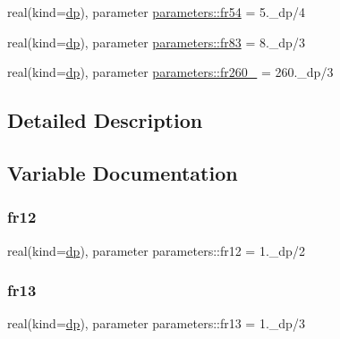 \begin{DoxyCompactItemize}
\item 
real(kind=\mbox{\hyperlink{namespaceparameters_a52f8c6351fd79345d8811e065bcbbb37}{dp}}), parameter \mbox{\hyperlink{group__FRACTIONS_ga4b5dee914c69f248bc576e0ef5a48cad}{parameters\+::fr54}} = 5.\+\_\+dp/4
\item 
real(kind=\mbox{\hyperlink{namespaceparameters_a52f8c6351fd79345d8811e065bcbbb37}{dp}}), parameter \mbox{\hyperlink{group__FRACTIONS_ga74e22f362165a8830c6acb135f54921a}{parameters\+::fr83}} = 8.\+\_\+dp/3
\item 
real(kind=\mbox{\hyperlink{namespaceparameters_a52f8c6351fd79345d8811e065bcbbb37}{dp}}), parameter \mbox{\hyperlink{group__FRACTIONS_ga5a9e77cd58019aeeb71cd5be86faf68f}{parameters\+::fr260\+\_}} = 260.\+\_\+dp/3
\end{DoxyCompactItemize}


\subsection{Detailed Description}


\subsection{Variable Documentation}
\mbox{\label{group__FRACTIONS_ga22877764fb6363b2fa930793c57a03da}} 
\subsubsection{\texorpdfstring{fr12}{fr12}}
{\footnotesize\ttfamily real(kind=\mbox{\hyperlink{namespaceparameters_a52f8c6351fd79345d8811e065bcbbb37}{dp}}), parameter parameters\+::fr12 = 1.\+\_\+dp/2}

\mbox{\label{group__FRACTIONS_ga7012f1eaa8d54fce4923459913c9ea89}} 
\subsubsection{\texorpdfstring{fr13}{fr13}}
{\footnotesize\ttfamily real(kind=\mbox{\hyperlink{namespaceparameters_a52f8c6351fd79345d8811e065bcbbb37}{dp}}), parameter parameters\+::fr13 = 1.\+\_\+dp/3}

